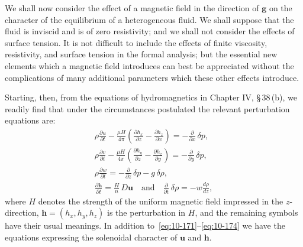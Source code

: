 We shall now consider the effect of a magnetic field in the direction of $\mathbf{g}$ on the character of the equilibrium of a heterogeneous fluid. We shall suppose that the fluid is inviscid and is of zero resistivity; and we shall not consider the effects of surface tension. It is not difficult to include the effects of finite viscosity, resistivity, and surface tension in the formal analysis; but the essential new elements which a magnetic field introduces can best be appreciated without the complications of many additional parameters which these other effects introduce.

Starting, then, from the equations of hydromagnetics in Chapter IV, \S\,38\,(b), we readily find that under the circumstances postulated the relevant perturbation equations are:
\begin{gather}
\rho\frac{\partial u}{\partial t}-\frac{\mu H}{4\pi}\!\left(\frac{\partial h_x}{\partial z}-\frac{\partial h_z}{\partial x}\right) = -\frac{\partial}{\partial x}\,\delta p, \label{eq:10-171}\\
\rho\frac{\partial v}{\partial t}-\frac{\mu H}{4\pi}\!\left(\frac{\partial h_y}{\partial z}-\frac{\partial h_z}{\partial y}\right) = -\frac{\partial}{\partial y}\,\delta p, \label{eq:10-172}\\
\rho\frac{\partial w}{\partial t} = -\frac{\partial}{\partial z}\,\delta p - g\,\delta\rho, \label{eq:10-173}\\
\frac{\partial\mathbf{h}}{\partial t} = \frac{H}{n}\,D\mathbf{u} \quad\text{and}\quad\frac{\partial}{\partial t}\,\delta\rho = -w\frac{d\rho}{dz}, \label{eq:10-174}
\end{gather}
where $H$ denotes the strength of the uniform magnetic field impressed in the $z$-direction, $\mathbf{h} = (h_x,h_y,h_z)$ is the perturbation in $H$, and the remaining symbols have their usual meanings. In addition to~\eqref{eq:10-171}--\eqref{eq:10-174} we have the equations expressing the solenoidal character of $\mathbf{u}$ and $\mathbf{h}$.


